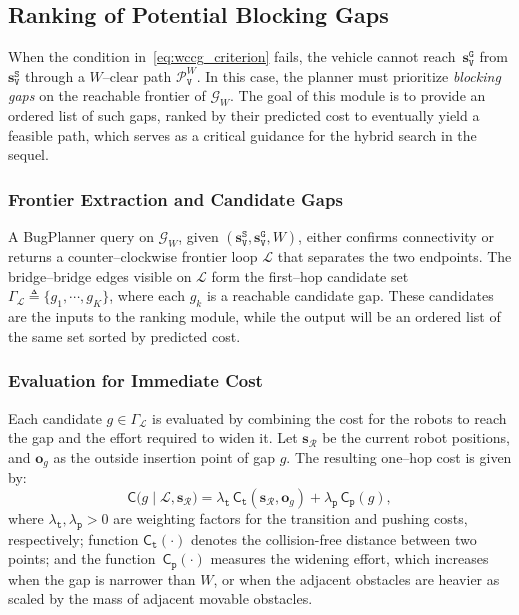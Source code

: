 \subsection{Ranking of Potential Blocking Gaps}\label{subsec:gap}

When the condition in~\eqref{eq:wccg_criterion} fails, the vehicle cannot
reach~$\mathbf{s}_\texttt{V}^{\texttt{G}}$ from
$\mathbf{s}_\texttt{V}^{\texttt{S}}$ through a $W$--clear path
$\mathcal{P}^W_\texttt{V}$. In this case, the planner must prioritize
\emph{blocking gaps} on the reachable frontier of $\mathcal{G}_W$. The goal of
this module is to provide an ordered list of such gaps, ranked by their
predicted cost to eventually yield a feasible path, which serves
as a critical guidance for the hybrid search in the sequel.

\subsubsection{Frontier Extraction and Candidate Gaps}
A BugPlanner query on $\mathcal{G}_W$, given
$(\mathbf{s}_\texttt{V}^{\texttt{S}},\mathbf{s}_\texttt{V}^{\texttt{G}},W)$,
either confirms connectivity or returns a counter--clockwise frontier loop
$\mathcal{L}$ that separates the two endpoints. The bridge--bridge edges
visible on $\mathcal{L}$ form the first--hop candidate set
$\Gamma_\mathcal{L}\triangleq\{g_1,\cdots,g_K\}$,
where each $g_k$ is a reachable candidate gap. These candidates are the inputs
to the ranking module, while the output will be an ordered list of the same
set sorted by predicted cost.

\subsubsection{Evaluation for Immediate Cost}
Each candidate $g\in\Gamma_\mathcal{L}$ is evaluated by combining the
cost for the robots to reach the gap and the effort required to widen it.
Let $\mathbf{s}_{\mathcal{R}}$ be the current robot positions,
and $\mathbf{o}_g$ as the outside insertion point of gap $g$. The
resulting one--hop cost is given by:
\begin{equation}\label{eq:step_cost}
\mathsf{C}\big(g \mid \mathcal{L}, \mathbf{s}_{\mathcal{R}}\big)
=\lambda_\texttt{t}\,\mathsf{C}_\texttt{t}\!\left(\mathbf{s}_{\mathcal{R}},\mathbf{o}_g\right)
+\lambda_\texttt{p}\,\mathsf{C}_\texttt{p}(g),
\end{equation}
where $\lambda_\texttt{t},\lambda_\texttt{p}>0$ are weighting factors
for the transition and pushing costs, respectively;
function $\mathsf{C}_\texttt{t}(\cdot)$ denotes the collision-free
distance between two points;
and the function~$\mathsf{C}_\texttt{p}(\cdot)$ measures the widening effort,
which increases when the gap is narrower than $W$,
or when the adjacent obstacles are heavier as scaled by the  mass of adjacent movable
obstacles.


